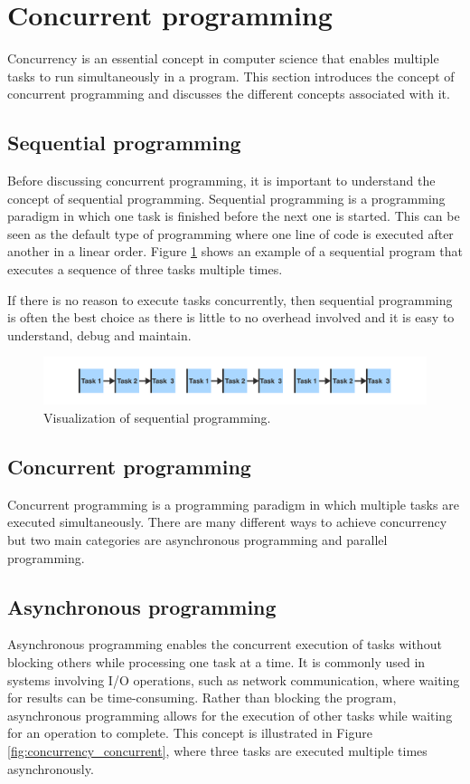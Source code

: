 \section{Concurrent programming}
Concurrency is an essential concept in computer science that enables multiple tasks to run simultaneously in a program.
This section introduces the concept of concurrent programming and discusses the different concepts associated with it.

\subsection{Sequential programming}
Before discussing concurrent programming, it is important to understand the concept of sequential programming.
Sequential programming is a programming paradigm in which one task is finished before the next one is started.
This can be seen as the default type of programming where one line of code is executed after another in a linear order.
Figure \ref{fig:concurrency_sequential} shows an example of a sequential program that executes a sequence of three tasks multiple times.

If there is no reason to execute tasks concurrently, then sequential programming is often the best choice as there is little to no overhead involved and it is easy to understand, debug and maintain.

\begin{figure}[H]
    \centering
    \includegraphics[width=\textwidth]{figures/concurrency/sequential.pdf}
    \caption{Visualization of sequential programming.}
    \label{fig:concurrency_sequential}
\end{figure}


\subsection{Concurrent programming}
Concurrent programming is a programming paradigm in which multiple tasks are executed simultaneously.
There are many different ways to achieve concurrency but two main  categories are asynchronous programming and parallel programming.


\subsection{Asynchronous programming}
Asynchronous programming enables the concurrent execution of tasks without blocking others while processing one task at a time.
It is commonly used in systems involving I/O operations, such as network communication, where waiting for results can be time-consuming.
Rather than blocking the program, asynchronous programming allows for the execution of other tasks while waiting for an operation to complete.
This concept is illustrated in Figure \ref{fig:concurrency_concurrent}, where three tasks are executed multiple times asynchronously.

